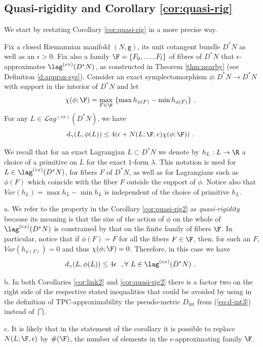 

\subsection{Quasi-rigidity and Corollary \ref{cor:quasi-rig}}\label{subsec:qrig-cor}

We start by restating Corollary \ref{cor:quasi-rig} in a more precise way.

\begin{cor}\label{cor:quasi-rig2} Fix  a closed  Riemannian manifold $(N,\mathtt{g})$, its unit cotangent
bundle $D^{\ast}N$ as well as an $\epsilon > 0$.  Fix also a family $\F =\{F_{0},\ldots, F_{l}\}$ of fibres of $D^{\ast}N$ that  $\epsilon$-approximates $\lag^{(ex)}(D^{\ast}N)$,  as constructed in Theorem \ref{thm:nearby}
(see Definition \ref{d:approx-sys}).  Consider an exact symplectomorphism  $\phi :D^{\ast}N\to D^{\ast}N$ with support in the
interior of $D^{\ast}N$ and let
 $$\chi (\phi; \F) =\max_{F\in\F}\ \{ \max h_{\phi(F)} - \min h_{\phi(F)}\}~.~$$
 For any $L\in \mathcal{L}ag^{(ex)}(D^{\ast}N)$, we have $$d_{\gamma}(L,\phi(L)) \leq 4(\epsilon + N(L;\F, \epsilon) \chi(\phi;\F))~.~$$
\end{cor}

We recall that for an exact Lagrangian $L\subset D^{\ast}N$ we denote by $h_{L}:L\to \R$ a choice of a primitive on $L$ for the exact $1$-form $\lambda$. This notation is used for $L\in\lag^{(ex)}(D^{\ast} N)$, for fibers $F$ of $D^{\ast}N$, as well as for Lagrangians such as $\phi(F)$ which coincide with the fiber $F$ outside the support of $\phi$. Notice also that $Var (h_{L})=\max h_{L} - \min h_{L}$ is independent of the choice of primitive $h_{L}$.

\begin{rem}\label{rem:quasi-isom}
a. We refer to the property in the Corollary \ref{cor:quasi-rig2} as  {\em quasi-rigidity} because its meaning is that  the size of the action of $\phi$ on the whole of $\lag^{(ex)}(D^{\ast}N)$ is constrained by that on the finite family of fibers $\F$. In particular, notice that if $\phi(F)=F$ for all the fibers $F\in \F$, then, for such an $F$, $Var(h_{\phi(F)})=0$ and  thus $\chi(\phi;\F)=0$. Therefore, in this case
we have $$d_{\gamma}(L,\phi(L)) \leq 4\epsilon \ \ , \forall \ L\in\lag^{(ex)}(D^{\ast}N)~.~$$

b. In both Corollaries \ref{cor:link2} and \ref{cor:quasi-rig2} there is a factor two 
on the right side of the respective stated inequalities that could be avoided by using in the definition of TPC-approximability the pseudo-metric $D_{\mathrm{int}}$ from  (\ref{eq:d-int3}) instead of $\dint$. 

c. It is likely that in the statement of the corollary it is possible to replace $N(L;\F,\epsilon)$ by
$\# (\F )$, the number of elements in the $\epsilon$-approximating family $\F$.
\end{rem}

